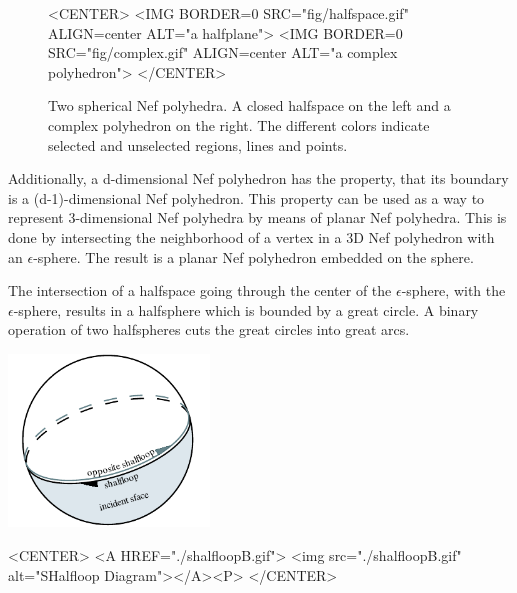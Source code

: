 \begin{figure}[htbp]
\begin{ccTexOnly}
\begin{center}
\end{center}
\end{ccTexOnly}
\caption{Two spherical Nef polyhedra. A closed halfspace on the left 
  and a complex polyhedron on the right. The different colors indicate
  selected and unselected regions, lines and points.}\label{nefexamples}
\begin{ccHtmlOnly}
<CENTER>
<IMG BORDER=0 SRC="fig/halfspace.gif" ALIGN=center
ALT="a halfplane">
<IMG BORDER=0 SRC="fig/complex.gif" ALIGN=center
ALT="a complex polyhedron">
</CENTER>
\end{ccHtmlOnly}
\end{figure}      

Additionally, a d-dimensional Nef polyhedron has the property, that its boundary
is a (d-1)-dimensional Nef polyhedron. This property can be used as a way to
represent 3-dimensional Nef polyhedra by means of planar Nef polyhedra.
This is done by intersecting the neighborhood of a vertex in a 3D Nef polyhedron
with an $\epsilon$-sphere. The result is a planar Nef polyhedron embedded
on the sphere.

The intersection of a halfspace going through the center of the $\epsilon$-sphere,
with the $\epsilon$-sphere, results in a halfsphere which is bounded by
a great circle. A binary operation of two halfspheres cuts the great circles
into great arcs.

\begin{ccTexOnly}
    \vspace{-7mm}
    \begin{center}
      \parbox{0.4\textwidth}{%
          \includegraphics[width=0.4\textwidth]{Nef_S2/fig/shalfloopB}%
      }
    \end{center}
    \vspace{-5mm}
\end{ccTexOnly}

\begin{ccHtmlOnly}
    <CENTER>
    <A HREF="./shalfloopB.gif">
        <img src="./shalfloopB.gif" alt="SHalfloop Diagram"></A><P>
    </CENTER>
\end{ccHtmlOnly}

